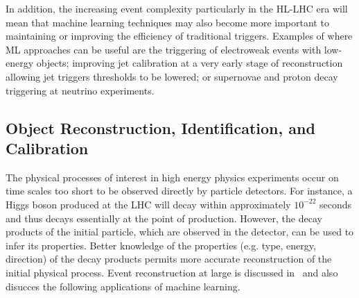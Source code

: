 In addition, the increasing event complexity particularly in the HL-LHC era will mean that machine learning techniques may also become more important to maintaining or improving the efficiency of traditional triggers. Examples of where ML approaches can be useful are the triggering of electroweak events with low-energy objects; improving jet calibration at a very early stage of reconstruction allowing jet triggers thresholds to be lowered; or supernovae and proton decay triggering at neutrino experiments.



\subsection{Object Reconstruction, Identification, and Calibration}
\label{sec:object-reco-id-calib}


The physical processes of interest in high energy physics experiments occur on time scales too short to be observed directly by particle detectors. For instance, a Higgs boson produced at the LHC will decay within approximately $10^{-22}$ seconds and thus decays essentially at the point of production. However, the decay products of the initial particle, which are observed in the detector, can be used to infer its properties. Better knowledge of the properties (e.g. type, energy, direction) of the decay products permits more accurate reconstruction of the initial physical process. Event reconstruction at large is discussed in~\cite{recoCWP} and also disucces the following applications of machine learning.

